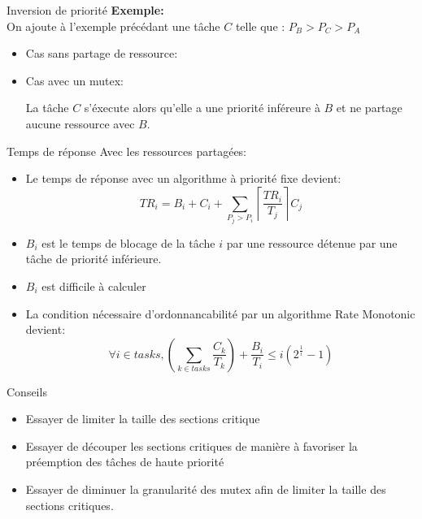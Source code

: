 \begin{frame}{Inversion de priorité}
  \textbf{Exemple:}\\
  On ajoute à l'exemple précédant une  tâche $C$ telle que : 
  $P_B > P_C > P_A$
  \begin{itemize} 
  \item   Cas sans partage de ressource:
    \begin{center}
      
    \end{center}
  \item   Cas avec un mutex:
    \begin{center}
      
    \end{center}
    La tâche  $C$ s'éxecute alors  qu'elle a une priorité  inféreure à
    $B$ et ne partage aucune ressource avec $B$.
  \end{itemize} 
\end{frame} 

\begin{frame}{Temps de réponse}
  Avec  les  ressources  partagées:
  \begin{itemize} 
  \item  Le  temps de  réponse  avec  un  algorithme à  priorité  fixe
    devient:
    $$TR_i = B_i + C_i + \sum_{P_j > P_i} \left\lceil\frac{TR_i}{T_j}\right\rceil C_j$$
  \item  $B_i$  est le  temps  de  blocage de  la  tâche  $i$ par  une
    ressource
    détenue par une tâche de priorité inférieure.
  \item $B_i$ est difficile à calculer
  \item La  condition nécessaire d'ordonnancabilité  par un algorithme
    Rate Monotonic devient:
    $$\forall i \in tasks, \left( \sum_{k \in tasks} \frac{C_k}{T_k} \right) + \frac{B_i}{T_i} ≤ i \left(2^{\frac{1}{i}}-1\right)$$
  \end{itemize} 
\end{frame}

\begin{frame}{Conseils}
  \begin{itemize} 
  \item Essayer de limiter la taille des sections critique
  \item  Essayer  de découper  les  sections  critiques  de manière  à
    favoriser la préemption des tâches de haute priorité
  \item Essayer de  diminuer la granularité des mutex  afin de limiter
    la taille des sections critiques.
  \end{itemize} 
\end{frame} 

